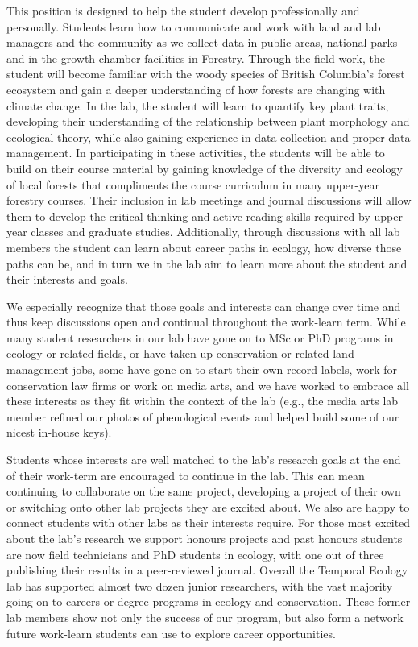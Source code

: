 \documentclass[11pt, oneside]{article}   	%
\begin{document}
This position is designed to help the student develop professionally and personally. Students learn how to communicate and work with land and lab managers and the community as we collect data in public areas, national parks and in the growth chamber facilities in Forestry. Through the field work, the student will become familiar with the woody species of British Columbia's forest ecosystem and gain a deeper understanding of how forests are changing with climate change. In the lab, the student will learn to quantify key plant traits, developing their understanding of the relationship between plant morphology and ecological theory, while also gaining experience in data collection and proper data management. In participating in these activities, the students will be able to build on their course material by gaining knowledge of the diversity and ecology of local forests that compliments the course curriculum in many upper-year forestry courses. Their inclusion in lab meetings and journal discussions will allow them to develop the critical thinking and active reading skills required by upper-year classes and graduate studies. Additionally, through discussions with all lab members the student can learn about career paths in ecology, how diverse those paths can be, and in turn we in the lab aim to learn more about the student and their interests and goals. 

We especially recognize that those goals and interests can change over time and thus keep discussions open and continual throughout the work-learn term. While many student researchers in our lab have gone on to MSc or PhD programs in ecology or related fields, or have taken up conservation or related land management jobs, some have gone on to start their own record labels, work for conservation law firms or work on media arts, and we have worked to embrace all these interests as they fit within the context of the lab (e.g., the media arts lab member refined our photos of phenological events and helped build some of our nicest in-house keys). 

Students whose interests are well matched to the lab's research goals at the end of their work-term are encouraged to continue in the lab. This can mean continuing to collaborate on the same project, developing a project of their own or switching onto other lab projects they are excited about. We also are happy to connect students with other labs as their interests require. For those most excited about the lab's research we support honours projects and past honours students are now field technicians and PhD students in ecology, with one out of three publishing their results in a peer-reviewed journal. Overall the Temporal Ecology lab has supported almost two dozen junior researchers, with the vast majority going on to careers or degree programs in ecology and conservation. These former lab members show not only the success of our program, but also form a network future work-learn students can use to explore career opportunities. 
\end{document}
